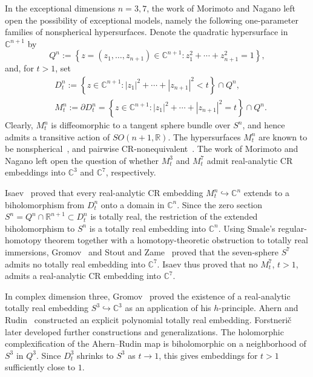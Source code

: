 \documentclass[11pt,a4paper,reqno]{amsart}
\begin{document}
In the exceptional dimensions 
$n=3,7$, the work of Morimoto and Nagano left open the possibility of exceptional models, namely the following one-parameter families of nonspherical hypersurfaces.  Denote the quadratic hypersurface in $\mathbb C^{n+1}$ by
\begin{equation}\label{eq:general-quadric}
Q^n:=\left\{z=(z_1,\ldots,z_{n+1})\in\mathbb C^{n+1}:          z_1^2+\cdots+z_{n+1}^2=1\right\},
\end{equation}
and, for $t>1$, set
\begin{equation}\label{eq:general-levels}
\begin{split}
&D_t^n:=\left\{z\in \mathbb C^{n+1}:|z_1|^2+\cdots+|z_{n+1}|^2<t\right\}\cap Q^n,\\
&M_t^n:=\partial D_t^n=\left\{z\in \mathbb C^{n+1}:|z_1|^2+\cdots+|z_{n+1}|^2=t\right\}\cap Q^n.   
\end{split}
\end{equation} 
Clearly, $M_t^n$ is diffeomorphic to a tangent sphere bundle over $S^n$, and hence admits a transitive action of $SO(n+1,\mathbb R)$. The hypersurfaces $M_t^n$
are known to be nonspherical~\cite{nemishafi}, and pairwise CR-nonequivalent~\cite{KaupZaitsev,BurnsHind}. The work of Morimoto and Nagano left open the question of whether \(M_t^3\) and \(M_t^7\) admit real-analytic CR embeddings into \(\mathbb C^3\) and \(\mathbb C^7\), respectively.


Isaev~\cite{Isaev2013} proved that every real-analytic CR embedding
$M_t^n\hookrightarrow\mathbb C^n$ extends to a biholomorphism from $D_t^n$ onto a domain in $\mathbb C^n$. Since the zero section
$S^n=Q^n\cap\mathbb R^{n+1}\subset D_t^n$ is totally real, the
restriction of the extended biholomorphism to $S^n$ is a  totally real embedding into $\mathbb C^n$. Using Smale's regular-homotopy theorem \cite{Smale} together with a homotopy-theoretic obstruction to totally real immersions, Gromov~\cite{Gromov1986} and Stout and Zame~\cite{StoutZame1986} proved that the seven-sphere $S^7$ admits no totally real embedding into $\mathbb C^7$. Isaev thus proved that no $M_t^7$, $t>1$, admits a real-analytic CR embedding into $\mathbb C^7$. 

In complex dimension three, Gromov~\cite{Gromov1973,Gromov1986} proved the existence of a real-analytic totally real embedding $S^3\hookrightarrow\mathbb C^3$ as an application of his $h$-principle. Ahern and Rudin~\cite{AhernRudin1985} constructed an explicit
polynomial totally real embedding. Forstneri\v{c}~\cite{Forstneric1986,Forstneric1990} later developed further constructions and generalizations. The holomorphic complexification of the Ahern--Rudin map is biholomorphic on a neighborhood of $S^3$ in $Q^3$. Since $D_t^3$ shrinks to $S^3$ as $t\rightarrow1$, this
gives embeddings for $t>1$ sufficiently close to $1$.
\end{document}
